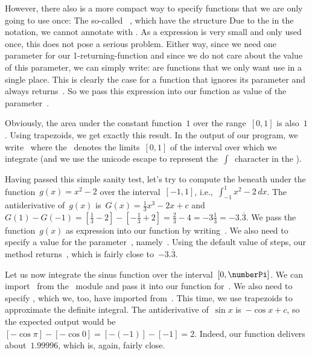 However, there also is a more compact way to specify functions that we are only going to use once:
The so-called ~\cite{PSF:P3D:TPLR:L}, which have the structure%
%
%
%
Due to the \pythonilIdx{:} in the notation, we cannot annotate  with .
As a  expression is very small and only used once, this does not pose a serious problem.
Either way, since we need one parameter for our 1-returning-function and since we do not care about the value of this parameter, we can simply write:%
%
%
%
 are functions that we only want use in a single place.
This is clearly the case for a function that ignores its parameter and always returns~.
So we pass this expression into our  function as value of the parameter~.

Obviously, the area under the constant function~$1$ over the range~$[0,1]$ is also~$1$.
Using  trapezoids, we get exactly this result.
In the output of our program, we write~ where the~ denotes the limits~$[0,1]$ of the interval over which we integrate (and we use the unicode escape  to represent the~$\int$~character in the ).

Having passed this simple sanity test, let's try to compute the beneath under the function~$g(x)=x^2-2$ over the interval~$[-1,1]$, i.e.,~$\int_{-1}^1 x^2-2\,dx$.
The antiderivative of~$g(x)$ is~$G(x)=\frac{1}{3}x^3-2x+c$ and $G(1)-G(-1)=[\frac{1}{3}-2]-[-\frac{1}{3}+2]=\frac{2}{3}-4=-3\frac{1}{3}=-3.\overline{3}$.
We pass the function~$g(x)$ as  expression into our  function by writing~.
We also need to specify a value for the parameter~, namely~.
Using the default value of  steps, our method returns~, which is fairly close to~$-3.\overline{3}$.

Let us now integrate the sinus function over the interval~$[0,\numberPi]$.
We can import~ from the ~module and pass it into our function for~.
We also need to specify , which we, too, have imported from~.
This time, we use  trapezoids to approximate the definite integral.
The antiderivative of~$\sin x$ is~$-\cos x+c$, so the expected output would be~$[-\cos\pi]-[-\cos 0]=[-(-1)]-[-1]=2$.
Indeed, our function delivers about~$1.99996$, which is, again, fairly close.

